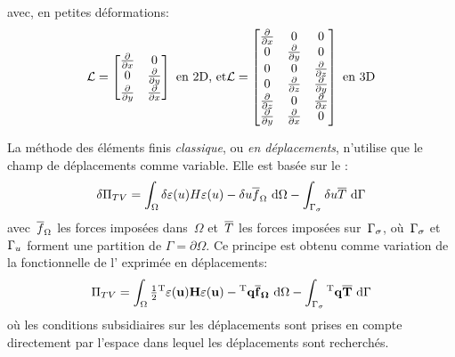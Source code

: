 avec, en petites déformations:
\begin{equation}
  \MM{\cL} = \MM*{
          \tfrac{\partial}{\partial x} & 0\\
          0 & \tfrac{\partial}{\partial y}\\
          \tfrac{\partial}{\partial y} &
          \tfrac{\partial}{\partial x}
      }
  \text{ en 2D, et}
  \MM{\cL} = \MM*{
          \tfrac{\partial}{\partial x} & 0 & 0\\
          0 & \tfrac{\partial}{\partial y} & 0\\
          0 & 0 & \tfrac{\partial}{\partial z}\\
          0 & \tfrac{\partial}{\partial z} &
          \tfrac{\partial}{\partial y}\\
          \tfrac{\partial}{\partial z} & 0&
          \tfrac{\partial}{\partial x} \\
          \tfrac{\partial}{\partial y} &
          \tfrac{\partial}{\partial x} &0\\
      }
  \text{ en 3D}
\end{equation}

\medskip
La méthode des éléments finis \emph{classique}, ou \emph{en
déplacements}, n'utilise que le champ de déplacements comme
variable. Elle est basée sur le :
\begin{equation}
  \label{Eq:deltaPiTV}
  \delta\Pi_{TV} = \displaystyle\int_{\Omega} \delta\varepsilon(u)H\varepsilon(u)
      - \delta u\overline{f}_{\Omega} \ \text{d}\Omega
      -\displaystyle\int_{\Gamma_\sigma} \delta u\overline{T} \ \text{d}\Gamma
\end{equation}
avec~$\overline{f}_{\Omega}$ les forces imposées dans~$\Omega$ et~$\overline{T}$ les forces imposées
sur~$\Gamma_\sigma$, où~$\Gamma_\sigma$ et~$\Gamma_u$ forment une partition de
$\Gamma=\partial\Omega$.
\medskip
Ce principe est obtenu comme variation de la fonctionnelle de
l' exprimée en déplacements:
\begin{equation}
  \label{Eq:PiTV}
  \Pi_{TV} = \dint_{\Omega} \tfrac12 \LL{\varepsilon(u)}\MM{H}\VV{\varepsilon(u)}
      - \LL{q}\VV{\fbar} \ \dd\Omega
      -\dint_{\ls} \LL{q}\VV{\Tbar} \ \dd\Gamma
\end{equation}
où les conditions subsidiaires sur les déplacements sont prises en compte
directement par l'espace dans lequel les déplacements sont recherchés.

